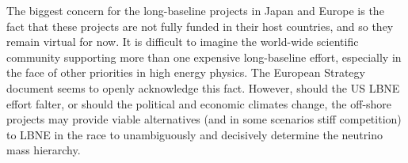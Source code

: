 The biggest concern for the long-baseline projects in Japan and Europe
is the fact that these projects are not fully funded in
their host countries, and so they remain virtual for now. It is
difficult to imagine the world-wide scientific community supporting
more than one expensive long-baseline effort, especially in the face
of other priorities in high energy physics. The European
Strategy document seems to openly acknowledge this fact. However,
should the US LBNE effort falter, or should the political and economic
climates change, the off-shore projects may provide viable
alternatives (and in some scenarios stiff competition) to LBNE in the
race to unambiguously and decisively determine the neutrino mass
hierarchy. 

